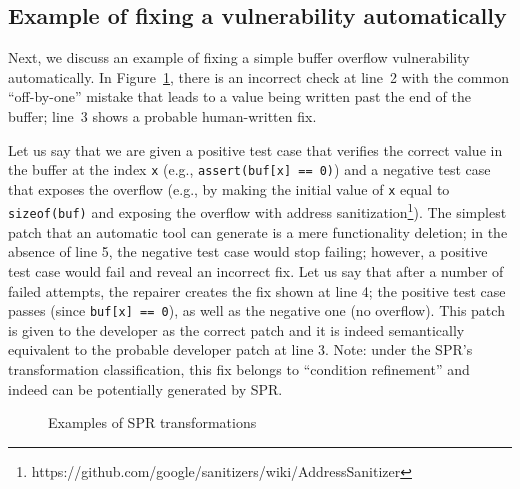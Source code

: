 \subsection{Example of fixing a vulnerability automatically}

Next, we discuss an example of fixing a simple buffer overflow vulnerability automatically. In Figure~\ref{figure:example}, there is an incorrect check at line~2 with the common ``off-by-one'' mistake that leads to a value being written past the end of the buffer; line~3 shows a probable human-written fix.

Let us say that we are given a positive test case that verifies the correct value in the buffer at the index \texttt{x} (e.g., \texttt{assert(buf[x] == 0)}) and a negative test case that exposes the overflow (e.g., by making the initial value of \texttt{x} equal to \texttt{sizeof(buf)} and exposing the overflow with address sanitization\footnote{https://github.com/google/sanitizers/wiki/AddressSanitizer}).
The simplest patch that an automatic tool can generate is a mere functionality deletion; in the absence of line 5, the negative test case would stop failing; however, a positive test case would fail and reveal an incorrect fix.
Let us say that after a number of failed attempts, the repairer creates the fix shown at line 4; the positive test case passes (since \texttt{buf[x] == 0}), as well as the negative one (no overflow).
This patch is given to the developer as the correct patch and it is indeed semantically equivalent to the probable developer patch at line 3.
Note: under the SPR's transformation classification, this fix belongs to ``condition refinement'' and indeed can be potentially generated by SPR.
\begin{figure}



\vspace{0.1in}
\small \caption{Examples of SPR transformations}
    \label{figure:example}
\vspace{-0.2in}
\end{figure}

